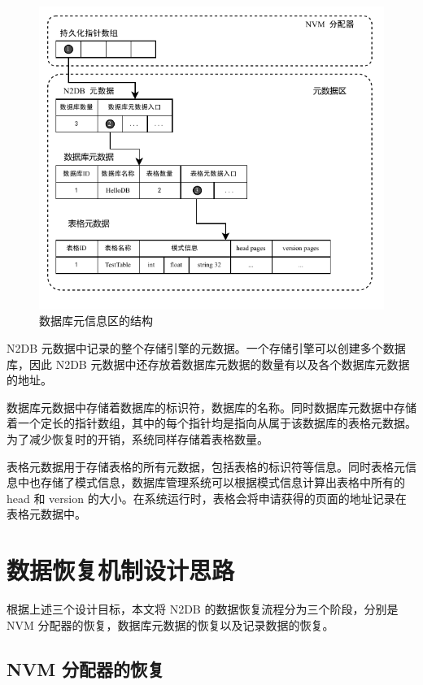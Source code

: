 \begin{figure}
    \centering
    \includegraphics[width=1\linewidth]{figures/catalog.pdf}
    \caption{数据库元信息区的结构}
    \label{fig:catalog}
\end{figure}

N2DB 元数据中记录的整个存储引擎的元数据。一个存储引擎可以创建多个数据库，因此 N2DB 元数据中还存放着数据库元数据的数量有以及各个数据库元数据的地址。

数据库元数据中存储着数据库的标识符，数据库的名称。同时数据库元数据中存储着一个定长的指针数组，其中的每个指针均是指向从属于该数据库的表格元数据。为了减少恢复时的开销，系统同样存储着表格数量。


表格元数据用于存储表格的所有元数据，包括表格的标识符等信息。同时表格元信息中也存储了模式信息，数据库管理系统可以根据模式信息计算出表格中所有的 head 和 version 的大小。在系统运行时，表格会将申请获得的页面的地址记录在表格元数据中。




\section{数据恢复机制设计思路}

根据上述三个设计目标，本文将 N2DB 的数据恢复流程分为三个阶段，分别是 NVM 分配器的恢复，数据库元数据的恢复以及记录数据的恢复。

\subsection{NVM 分配器的恢复}
\label{ssec:allocator-recovery}

